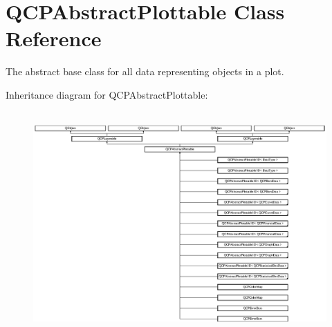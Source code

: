 \hypertarget{class_q_c_p_abstract_plottable}{}\section{Q\+C\+P\+Abstract\+Plottable Class Reference}
\label{class_q_c_p_abstract_plottable}


The abstract base class for all data representing objects in a plot.  


Inheritance diagram for Q\+C\+P\+Abstract\+Plottable\+:\begin{figure}[H]
\begin{center}
\leavevmode
\includegraphics[height=8.608415cm]{class_q_c_p_abstract_plottable}
\end{center}
\end{figure}
